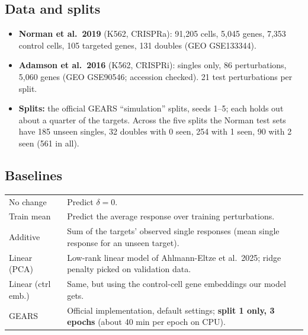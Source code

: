 \documentclass[10.5pt]{article}
\begin{document}
\subsection*{Data and splits}
\begin{itemize}
\item \textbf{Norman et al.\ 2019} (K562, CRISPRa): 91,205 cells, 5,045 genes, 7,353 control cells,
105 targeted genes, 131 doubles (GEO GSE133344).
\item \textbf{Adamson et al.\ 2016} (K562, CRISPRi): singles only, 86 perturbations, 5,060 genes
(GEO GSE90546; accession checked). 21 test perturbations per split.
\item \textbf{Splits:} the official GEARS ``simulation'' splits, seeds 1--5; each holds out about a quarter of
the targets. Across the five splits the Norman test sets have 185 unseen singles, 32 doubles with 0 seen,
254 with 1 seen, 90 with 2 seen (561 in all).
\end{itemize}

\subsection*{Baselines}
\begin{tabular}{@{}p{3.6cm}p{11.9cm}@{}}
\toprule
No change & Predict $\delta=0$.\\
Train mean & Predict the average response over training perturbations.\\
Additive & Sum of the targets' observed single responses (mean single response for an unseen target).\\
Linear (PCA) & Low-rank linear model of Ahlmann-Eltze et al.\ 2025; ridge penalty picked on validation data.\\
Linear (ctrl emb.) & Same, but using the control-cell gene embeddings our model gets.\\
GEARS & Official implementation, default settings; \textbf{split 1 only, 3 epochs} (about 40 min per epoch on CPU).\\
\bottomrule
\end{tabular}
\end{document}
